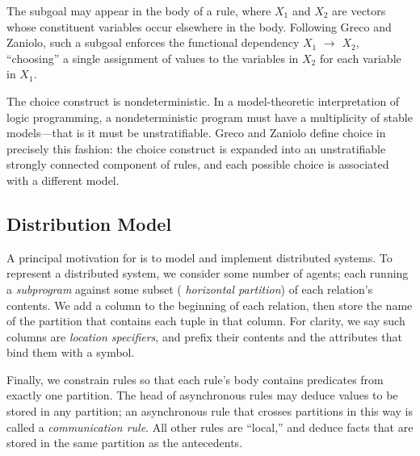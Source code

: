 The subgoal  may appear in the body of a rule, where
\emph{$X_1$} and \emph{$X_2$} are vectors whose constituent variables occur elsewhere in the body.  Following Greco and Zaniolo, such a subgoal
enforces the functional dependency \emph{$X_1$} $\to$ $X_2$, ``choosing'' a single assignment of values to the variables
in \emph{$X_2$} for each variable in \emph{$X_1$}.

The choice construct is nondeterministic.  In a model-theoretic interpretation of logic programming, a nondeterministic program 
must have a multiplicity of stable models---that is it must be unstratifiable.  Greco and Zaniolo define 
choice in precisely this fashion: the choice construct is expanded into an unstratifiable strongly connected component of rules, 
and each possible choice is associated with a different model.

  

\subsection{Distribution Model}

A principal motivation for \lang is to model and implement distributed
systems.  To represent a distributed system, we consider some number
of agents; each running a {\em subprogram} against some subset ({\em
  horizontal partition}) of each relation's contents.  We add a column
to the beginning of each relation, then store the name of the
partition that contains each tuple in that column.  For clarity, we
say such columns are {\em location specifiers}, and prefix their
contents and the attributes that bind them with a \dedalus{\#} symbol.

Finally, we constrain \lang rules so that each rule's body contains
predicates from exactly one partition.  The head of asynchronous rules
may deduce values to be stored in any partition; an asynchronous rule
that crosses partitions in this way is called a {\em communication
  rule}.  All other rules are ``local,'' and deduce facts that are
stored in the same partition as the antecedents.


